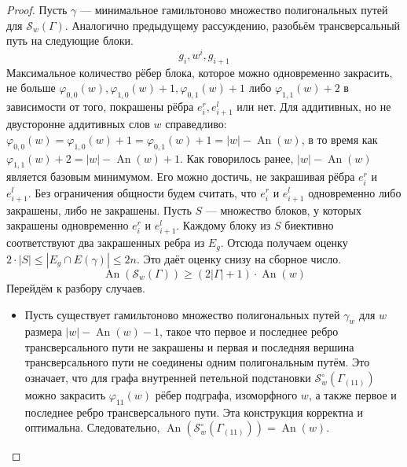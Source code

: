 \documentclass{article}
\theoremstyle{definition}
\newcommand{\An}{\operatorname{An}}
\begin{document}
\begin{proof}
    Пусть $\gamma$ — минимальное гамильтоново множество полигональных путей для $\mathcal{S}_w(\Gamma)$. Аналогично предыдущему рассуждению, разобьём трансверсальный путь на следующие блоки.
    \[
        g_i, w^i, g_{i + 1}
    \]
    Максимальное количество рёбер блока, которое можно одновременно закрасить, не больше $\varphi_{0,0}(w), \varphi_{1,0}(w) + 1, \varphi_{0,1}(w) + 1$ либо $\varphi_{1,1}(w) + 2$ в зависимости от того, покрашены рёбра $e_i^r, e_{i + 1}^l$ или нет. Для аддитивных, но не двусторонне аддитивных слов $w$ справедливо: $\varphi_{0,0}(w) = \varphi_{1,0}(w) + 1 = \varphi_{0,1}(w) + 1 = |w| - \An(w)$, в то время как $\varphi_{1,1}(w) +2= |w| - \An(w) + 1$. Как говорилось ранее, $|w| - \An(w)$ является базовым минимумом. Его можно достичь, не закрашивая рёбра $e_i^r$ и $e_{i + 1}^l$. Без ограничения общности будем считать, что $e_i^r$ и $e_{i + 1}^l$ одновременно либо закрашены, либо не закрашены. Пусть $S$ — множество блоков, у которых закрашены одновременно $e_i^r$ и $e_{i + 1}^l$. Каждому блоку из $S$ биективно соответствуют два закрашенных ребра из $E_g$. Отсюда получаем оценку $2\cdot|S| \leq |E_g\cap E(\gamma)| \leq 2n$. Это даёт оценку снизу на сборное число.
    \[
        \An(\mathcal{S}_w(\Gamma)) \geq (2|\Gamma| + 1) \cdot \An(w)
    \]
    Перейдём к разбору случаев.
    \begin{itemize}
        \item Пусть существует гамильтоново множество полигональных путей $\gamma_w$ для $w$ размера $|w| - \An(w) - 1$, такое что первое и последнее ребро трансверсального пути не закрашены и первая и последняя вершина трансверсального пути не соединены одним полигональным путём. Это означает, что для графа внутренней петельной подстановки $\mathcal{S}_w^\circ(\Gamma_{(11)})$ можно закрасить $\varphi_{11}(w)$ рёбер подграфа, изоморфного $w$, а также первое и последнее ребро трансверсального пути. Эта конструкция корректна и оптимальна. Следовательно, $\An(\mathcal{S}_w^\circ(\Gamma_{(11)})) = \An(w)$.


\end{itemize}
\end{proof}
\end{document}
